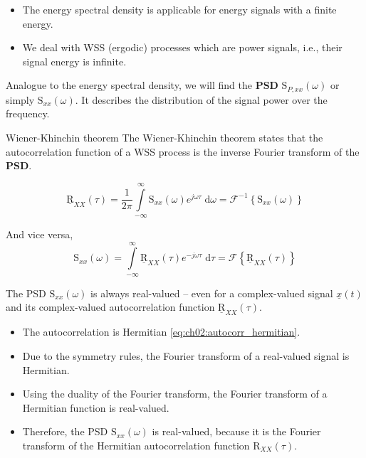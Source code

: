 \begin{refsection}
\begin{itemize}
	\item The energy spectral density is applicable for energy signals with a finite energy.
	\item We deal with \ac{WSS} (ergodic) processes which are power signals, i.e., their signal energy is infinite.
\end{itemize}

Analogue to the energy spectral density, we will find the  \textbf{\ac{PSD}} $\mathrm{S}_{P,xx}(\omega)$ or simply $\mathrm{S}_{xx}(\omega)$. It describes the distribution of the signal power over the frequency. 

\begin{definition}{Wiener-Khinchin theorem}
	The  Wiener-Khinchin theorem states that the autocorrelation function of a \ac{WSS} process is the inverse Fourier transform of the  \textbf{\ac{PSD}}.
	
	\begin{equation}
		\underline{\mathrm{R}}_{XX}(\tau) = \frac{1}{2 \pi} \int\limits_{-\infty}^{\infty} \mathrm{S}_{xx}(\omega) e^{j \omega \tau} \; \mathrm{d} \omega = \mathcal{F}^{-1} \left\{\mathrm{S}_{xx}(\omega)\right\}
	\end{equation}
	
	And vice versa,
	\begin{equation}
		\mathrm{S}_{xx}(\omega) = \int\limits_{-\infty}^{\infty} \underline{\mathrm{R}}_{XX}(\tau) e^{-j \omega \tau} \; \mathrm{d} \tau = \mathcal{F}\left\{\underline{\mathrm{R}}_{XX}(\tau)\right\}
		\label{eq:ch03:psd_def}
	\end{equation}
\end{definition}

The \ac{PSD} $\mathrm{S}_{xx}(\omega)$ is always real-valued -- even for a complex-valued signal $\underline{x}(t)$ and its complex-valued autocorrelation function $\underline{\mathrm{R}}_{XX}(\tau)$.
\begin{itemize}
	\item The autocorrelation is Hermitian \eqref{eq:ch02:autocorr_hermitian}.
	\item Due to the symmetry rules, the Fourier transform of a real-valued signal is Hermitian.
	\item Using the duality of the Fourier transform, the Fourier transform of a Hermitian function is real-valued.
	\item Therefore, the \ac{PSD} $\mathrm{S}_{xx}(\omega)$ is real-valued, because it is the Fourier transform of the Hermitian autocorrelation function $\mathrm{R}_{XX}(\tau)$.
\end{itemize}


\end{refsection}
